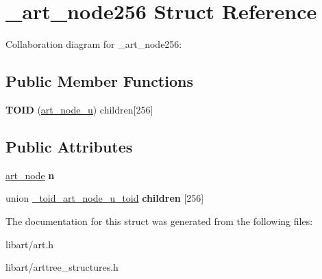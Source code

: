 \hypertarget{struct__art__node256}{}\section{\+\_\+art\+\_\+node256 Struct Reference}
\label{struct__art__node256}


Collaboration diagram for \+\_\+art\+\_\+node256\+:
\subsection*{Public Member Functions}
\begin{DoxyCompactItemize}
\item 
\mbox{\label{struct__art__node256_a944164248d2f74ef56471c1db080c7ca}} 
{\bfseries T\+O\+ID} (\hyperlink{struct__art__node__u}{art\+\_\+node\+\_\+u}) children\mbox{[}256\mbox{]}
\end{DoxyCompactItemize}
\subsection*{Public Attributes}
\begin{DoxyCompactItemize}
\item 
\mbox{\label{struct__art__node256_a3226feced4b9d35d11a25582827a0b98}} 
\hyperlink{struct__art__node}{art\+\_\+node} {\bfseries n}
\item 
\mbox{\label{struct__art__node256_a3d58086b3e06c83ae35e6304e4d1df9e}} 
union \hyperlink{union__toid__art__node__u__toid}{\+\_\+toid\+\_\+art\+\_\+node\+\_\+u\+\_\+toid} {\bfseries children} \mbox{[}256\mbox{]}
\end{DoxyCompactItemize}


The documentation for this struct was generated from the following files\+:\begin{DoxyCompactItemize}
\item 
libart/art.\+h\item 
libart/arttree\+\_\+structures.\+h\end{DoxyCompactItemize}
